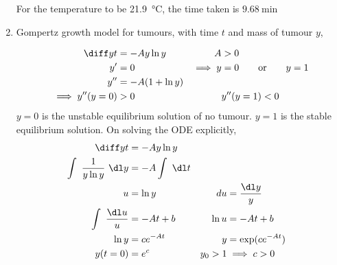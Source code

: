 \begin{enumerate}
          For the temperature to be \SI{21.9}{\celsius}, the time taken is
          $ \SI{9.68}{\minute} $

    \item Gompertz growth model for tumours, with time $ t $ and mass of tumour $ y $,

          \begin{align}
              \diff yt            & = -Ay\ln y                          &
              A                   & >0                                    \\
              y'                  & = 0                                 &
              \implies y          & = 0 \qquad \mathrm{or} \qquad y = 1   \\
              y''                 & = -A(1 + \ln y)                       \\
              \implies y''(y = 0) & >0                                  &
                                  & y''(y = 1)< 0
          \end{align}
          $ y = 0 $ is the unstable equilibrium solution of no tumour. $ y = 1 $
          is the stable equilibrium solution. On solving the ODE explicitly,
          \begin{align}
              \diff yt                      & = -Ay \ln y         \\
              \int\ \frac{1}{y\ln y}\ \dl y & = -A \int\ \dl t    \\
              u                             & = \ln y           &
              du                            & = \frac{\dl y}{y}   \\
              \int\ \frac{\dl u}{u}         & = -At + b         &
              \ln u                         & = -At + b           \\
              \ln y                         & = ce^{-At}        &
              y                             & = \exp(ce^{-At})    \\
              y(t = 0)                      & = e^{c}           &
              y_{0} > 1                     & \implies c > 0
          \end{align}


\end{enumerate}

